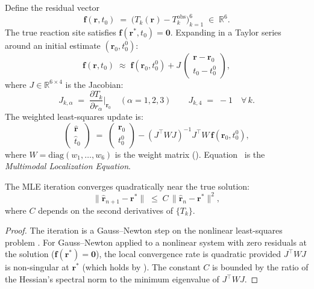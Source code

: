 Define the residual vector
\begin{equation}
    \mathbf{f}(\mathbf{r}, t_0)
    \;=\; \bigl(T_k(\mathbf{r}) - T_k^\mathrm{obs}\bigr)_{k=1}^6
    \;\in\; \mathbb{R}^6.
\end{equation}
The true reaction site satisfies $\mathbf{f}(\mathbf{r}^*, t_0) = \mathbf{0}$.
Expanding in a Taylor series around an initial estimate $(\mathbf{r}_0, t_0^0)$:
\begin{equation}
    \mathbf{f}(\mathbf{r}, t_0)
    \;\approx\;
    \mathbf{f}(\mathbf{r}_0, t_0^0)
    + J\,\begin{pmatrix}\mathbf{r} - \mathbf{r}_0 \\ t_0 - t_0^0\end{pmatrix},
\end{equation}
where $J \in \mathbb{R}^{6\times 4}$ is the Jacobian:
\begin{equation}
    J_{k,\alpha}
    \;=\; \frac{\partial T_k}{\partial r_\alpha}\bigg|_{\mathbf{r}_0}
    \quad (\alpha = 1,2,3)
    \qquad
    J_{k,4} \;=\; -1 \quad \forall\,k.
    \label{eq:jacobian}
\end{equation}
The weighted least-squares update is:
\begin{equation}
    \begin{pmatrix}\hat{\mathbf{r}} \\ \hat{t}_0\end{pmatrix}
    \;=\;
    \begin{pmatrix}\mathbf{r}_0 \\ t_0^0\end{pmatrix}
    -
    (J^\top W J)^{-1} J^\top W\, \mathbf{f}(\mathbf{r}_0, t_0^0),
    \label{eq:mle}
\end{equation}
where $W = \mathrm{diag}(w_1, \ldots, w_6)$ is the weight matrix
().  Equation~ is the
\emph{Multimodal Localization Equation}.

\begin{theorem}
\label{thm:mle-convergence}
The MLE iteration  converges quadratically near the true
solution:
\begin{equation}
    \|\hat{\mathbf{r}}_{n+1} - \mathbf{r}^*\|
    \;\le\;
    C\,\|\hat{\mathbf{r}}_n - \mathbf{r}^*\|^2,
\end{equation}
where $C$ depends on the second derivatives of $\{T_k\}$.
\end{theorem}

\begin{proof}
The iteration  is a Gauss--Newton step on the nonlinear
least-squares problem .  For Gauss--Newton applied to
a nonlinear system with zero residuals at the solution ($\mathbf{f}(\mathbf{r}^*)
= \mathbf{0}$), the local convergence rate is quadratic provided $J^\top W J$
is non-singular at $\mathbf{r}^*$ (which holds by ).
The constant $C$ is bounded by the ratio of the Hessian's spectral norm to
the minimum eigenvalue of $J^\top W J$.
\end{proof}

